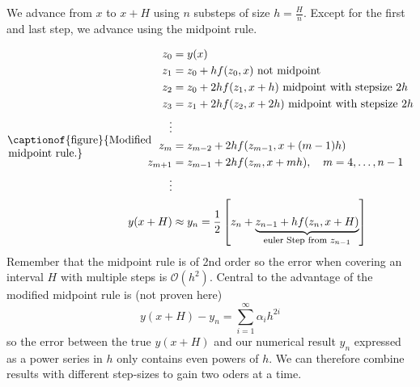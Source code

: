 We advance from $x$ to $x + H$ using $n$ substeps of size $h = \frac{H}{n}$. Except for the first and
last step, we advance using the midpoint rule.

\begin{equation}
  \vcenter{\hbox{\begin{minipage}{0.2\textwidth}
  \centering
  
  \captionof{figure}{Modified midpoint rule.}
  \end{minipage}}}
  \qquad\qquad
  \begin{aligned}
      z_0 &= y(x) \\
      z_1 &= z_0 + h f(z_0, x) \text{ not midpoint}\\
      z_2 &= z_0 + 2h f(z_1, x + h) \text{ midpoint with stepsize } 2h\\
      z_3 &= z_1 + 2h f(z_2, x + 2h) \text{ midpoint with stepsize } 2h\\
      \vdots \\
      z_m &= z_{m-2} + 2hf(z_{m-1},x+(m-1)h) \\
      z_{m + 1} &= z_{m-1} + 2hf(z_{m},x+mh), \quad m=4,\dots,n-1 \\
      \vdots \\
      y(x+H) &\approx y_n = \frac{1}{2} \left[ z_n + \explain{z_{n-1} + hf(z_n,x+H)}{euler Step from $z_{n-1}$} \right]
  \end{aligned}
\end{equation}
Remember that the midpoint rule is of 2nd order so the error when covering an interval $H$ with multiple steps
is $\mathcal{O}(h^2)$. Central to the advantage of the modified midpoint rule is (not proven here)
\begin{equation}
  y(x+H) - y_n = \sum_{i=1}^{\infty} \alpha_i h^{2i}
\end{equation}
so the error between the true $y(x+H)$ and our numerical result $y_n$ expressed as a power
series in $h$ only contains even powers of $h$. \textcolor{green1}{We can therefore combine results
with different step-sizes to gain two oders at a time}.
